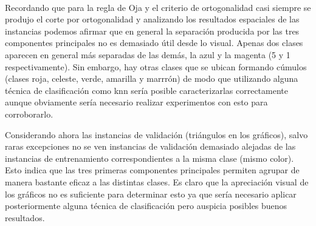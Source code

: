 \documentclass[informe.tex]{subfiles}
\begin{document}
	~
	
	Recordando que para la regla de Oja y el criterio de ortogonalidad casi siempre se produjo el corte por ortogonalidad y analizando los resultados espaciales de las instancias podemos afirmar que en general la separación producida por las tres componentes principales no es demasiado útil desde lo visual. Apenas dos clases aparecen en general más separadas de las demás, la azul y la magenta (5 y 1 respectivamente). Sin embargo, hay otras clases que se ubican formando cúmulos (clases roja, celeste, verde, amarilla y marrrón) de modo que utilizando alguna técnica de clasificación como knn sería posible caracterizarlas correctamente aunque obviamente sería necesario realizar experimentos con esto para corroborarlo.
	
	Considerando ahora las instancias de validación (triángulos en los gráficos), salvo raras excepciones no se ven instancias de validación demasiado alejadas de las instancias de entrenamiento correspondientes a la misma clase (mismo color). Esto indica que las tres primeras componentes principales permiten agrupar de manera bastante eficaz a las distintas clases. Es claro que la apreciación visual de los gráficos no es suficiente para determinar esto ya que sería necesario aplicar posteriormente alguna técnica de clasificación pero auspicia posibles buenos resultados.
	
\end{document}

